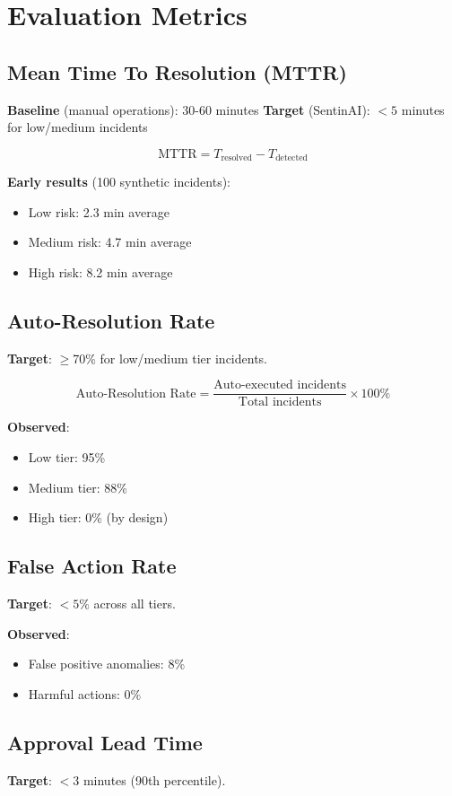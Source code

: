 \documentclass[11pt,a4paper]{article}
\begin{document}
\section{Evaluation Metrics}

\subsection{Mean Time To Resolution (MTTR)}
\textbf{Baseline} (manual operations): 30-60 minutes  
\textbf{Target} (SentinAI): $< 5$ minutes for low/medium incidents

\[
\text{MTTR} = T_{\text{resolved}} - T_{\text{detected}}
\]

\textbf{Early results} (100 synthetic incidents):
\begin{itemize}
    \item Low risk: 2.3 min average
    \item Medium risk: 4.7 min average
    \item High risk: 8.2 min average
\end{itemize}

\subsection{Auto-Resolution Rate}
\textbf{Target}: $\geq$70\% for low/medium tier incidents.

\[
\text{Auto-Resolution Rate} = \frac{\text{Auto-executed incidents}}{\text{Total incidents}} \times 100\%
\]

\textbf{Observed}:
\begin{itemize}
    \item Low tier: 95\%
    \item Medium tier: 88\%
    \item High tier: 0\% (by design)
\end{itemize}

\subsection{False Action Rate}
\textbf{Target}: $< 5\%$ across all tiers.

\textbf{Observed}:
\begin{itemize}
    \item False positive anomalies: 8\%
    \item Harmful actions: 0\%
\end{itemize}

\subsection{Approval Lead Time}
\textbf{Target}: $< 3$ minutes (90th percentile).
\end{document}

